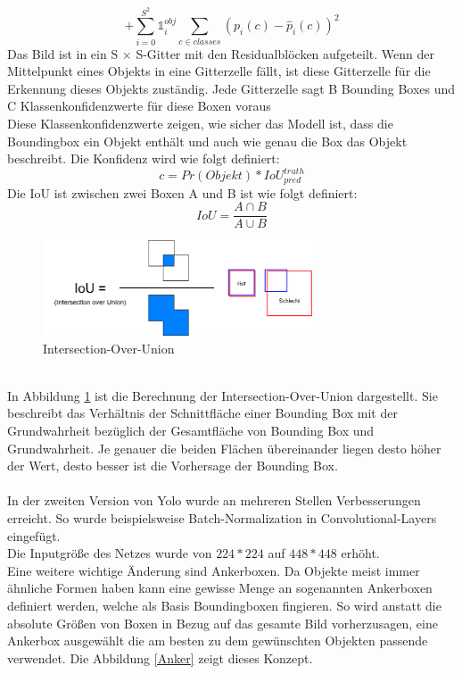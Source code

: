 \documentclass[conference]{IEEEtran}
\begin{document}
	\[ + \sum_{i=0}^{S^2} \mathbb{1}_{i}^{obj} \sum_{c \in classes} (p_i(c) - \hat{p}_i(c))^2 \]
	Das Bild ist in ein S × S-Gitter mit den Residualblöcken aufgeteilt. Wenn der Mittelpunkt eines Objekts in eine Gitterzelle fällt, ist diese Gitterzelle für die Erkennung dieses Objekts zuständig. Jede Gitterzelle sagt B Bounding Boxes und C Klassenkonfidenzwerte für diese Boxen voraus \cite{b1}\\
	Diese Klassenkonfidenzwerte zeigen, wie sicher das Modell ist, dass die Boundingbox ein Objekt enthält und auch wie genau die Box das Objekt beschreibt. Die Konfidenz wird wie folgt definiert:
	\[ c = Pr(Objekt) * IoU_{pred}^{truth} \]
	Die IoU ist zwischen zwei Boxen A und B ist wie folgt definiert:
	\[ IoU = \frac{A \cap B}{A \cup B} \]
	\begin{figure}[h]
		\begin{center}
			\includegraphics[width=8cm]{Media/Iou.png}
			\caption{Intersection-Over-Union}
			\label{IoU}
		\end{center}
	\end{figure}\\
	In Abbildung \ref{IoU} ist die Berechnung der Intersection-Over-Union dargestellt. Sie beschreibt das Verhältnis der Schnittfläche einer Bounding Box mit der Grundwahrheit bezüglich der Gesamtfläche von Bounding Box und Grundwahrheit. Je genauer die beiden Flächen übereinander liegen desto höher der Wert, desto besser ist die Vorhersage der Bounding Box.\\
	\\
	In der zweiten Version von Yolo wurde an mehreren Stellen Verbesserungen erreicht. So wurde beispielsweise Batch-Normalization in Convolutional-Layers eingefügt.\\
	Die Inputgröße des Netzes wurde von $224*224$ auf $448*448$ erhöht.\\
	Eine weitere wichtige Änderung sind Ankerboxen. Da Objekte meist immer ähnliche Formen haben kann eine gewisse Menge an sogenannten Ankerboxen definiert werden, welche als Basis Boundingboxen fingieren. So wird anstatt die absolute Größen von Boxen in Bezug auf das gesamte Bild vorherzusagen, eine Ankerbox ausgewählt die am besten zu dem gewünschten Objekten passende verwendet. Die Abbildung \ref{Anker} zeigt dieses Konzept.
\end{document}
